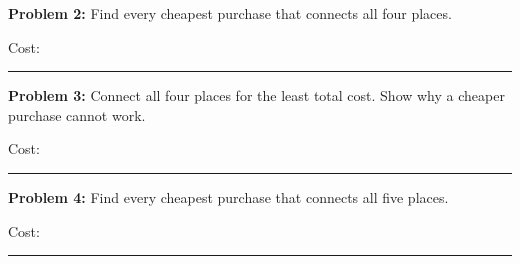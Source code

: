 \documentclass[12pt,letterpaper]{article}
\newcommand\Band{Grades K--5}
\newcommand\problem[2]{\textbf{Problem #1:} #2\par}
\newcommand\cost{Cost: \rule{1.2cm}{0.4pt}}
\begin{document}
\newpage

\problem{2}{Find every cheapest purchase that connects all four places.}

\vspace{0.6in}
\begin{center}\FourTies\end{center}
\vspace{0.4in}
\cost
\vspace{0.8in}
\begin{center}
\FourTiesRecord\hfill\FourTiesRecord\hfill\FourTiesRecord
\end{center}
\vspace{0.3in}
\begin{center}
\FourTiesRecord\hspace{1.2in}\FourTiesRecord
\end{center}

\newpage

\problem{3}{Connect all four places for the least total cost. Show why a cheaper purchase cannot work.}

\vspace{0.65in}
\begin{center}\FourTrap\end{center}
\vspace{0.35in}
\cost
\vspace{0.6in}
\begin{center}\FourTrapRecord\hspace{1.2in}\FourTrapRecord\end{center}

\newpage

\problem{4}{Find every cheapest purchase that connects all five places.}

\vspace{0.6in}
\begin{center}\FiveTies\end{center}
\vspace{0.3in}
\cost
\vspace{0.65in}
\begin{center}\FiveTiesRecord\hfill\FiveTiesRecord\hfill\FiveTiesRecord\end{center}
\vspace{0.3in}
\begin{center}\FiveTiesRecord\hspace{1.2in}\FiveTiesRecord\end{center}

\newpage

\renewcommand\Band{Grades 4--5}
\end{document}
